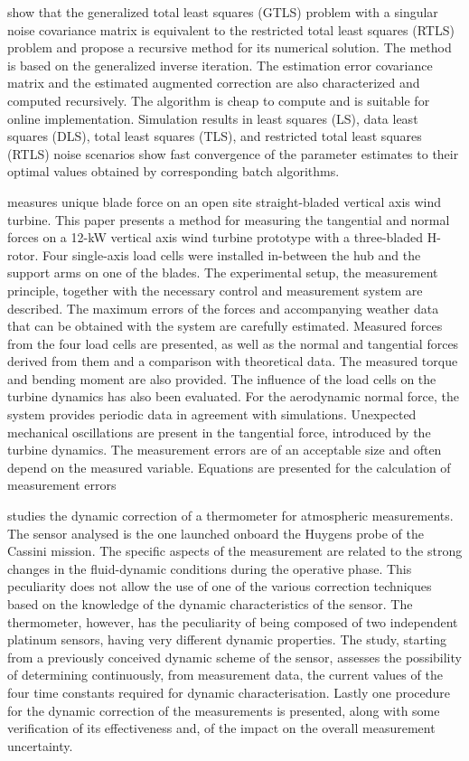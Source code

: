 \documentclass[11pt]{article}
\begin{document}
\citet{Rhode14recursive} show that the generalized total least squares (GTLS) problem with a singular noise covariance matrix is equivalent to the restricted total least squares (RTLS) problem and propose a recursive method for its numerical solution. The method is based on the generalized inverse iteration. The estimation error covariance matrix and the estimated augmented correction are also characterized and computed recursively. The algorithm is cheap to compute and is suitable for online implementation. Simulation results in least squares (LS), data least squares (DLS), total least squares (TLS), and restricted total least squares (RTLS) noise scenarios show fast convergence of the parameter estimates to their optimal values obtained by corresponding batch algorithms.

\citet{Rossander15} measures unique blade force on an open site straight-bladed vertical axis wind turbine. This paper presents a method for measuring the tangential and normal forces on a 12-kW vertical axis wind turbine prototype with a three-bladed H-rotor. Four single-axis load cells were installed in-between the hub and the support arms on one of the blades. The experimental setup, the measurement principle, together with the necessary control and measurement system are described. The maximum errors of the forces and accompanying weather data that can be obtained with the system are carefully estimated. Measured forces from the four load cells are presented, as well as the normal and tangential forces derived from them and a comparison with theoretical data. The measured torque and bending moment are also provided. The influence of the load cells on the turbine dynamics has also been evaluated. For the aerodynamic normal force, the system provides periodic data in agreement with simulations. Unexpected mechanical oscillations are present in the tangential force, introduced by the turbine dynamics. The measurement errors are of an acceptable size and often depend on the measured variable. Equations are presented for the calculation of measurement errors

\citet{Saggin01} studies the dynamic correction of a thermometer for atmospheric measurements. The sensor analysed is the one launched onboard the Huygens probe of the Cassini mission. The specific aspects of the measurement are related to the strong changes in the fluid-dynamic conditions during the operative phase. This peculiarity does not allow the use of one of the various correction techniques based on the knowledge of the dynamic characteristics of the sensor. The thermometer, however, has the peculiarity of being composed of two independent platinum sensors, having very different dynamic properties. The study, starting from a previously conceived dynamic scheme of the sensor, assesses the possibility of determining continuously, from measurement data, the current values of the four time constants required for dynamic characterisation. Lastly one procedure for the dynamic correction of the measurements is presented, along with some verification of its effectiveness and, of the impact on the overall measurement uncertainty.
\end{document}
